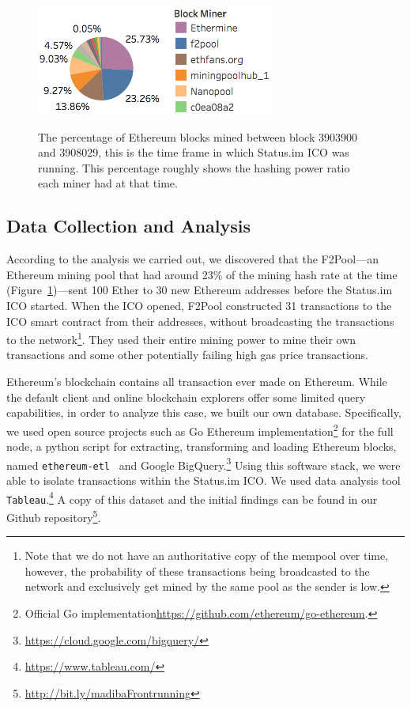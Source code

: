 \begin{figure}[h]
    \centering
{\caption[Ethereum blocks producers during the time of Status.im ICO]{The percentage of Ethereum blocks mined between block 3903900 and 3908029, this is the time frame in which Status.im ICO was running. This percentage roughly shows the hashing power ratio each miner had at that time.}\label{fig:mining_pool_ratio}}
{\includegraphics[width=0.7\textwidth]{figures/Mining_pool_ratio.png}}
\end{figure}

\subsection{Data Collection and Analysis}
According to the analysis we carried out, we discovered that the F2Pool---an Ethereum mining pool that had around 23\% of the mining hash rate at the time (Figure~\ref{fig:mining_pool_ratio})---sent 100 Ether to 30 new Ethereum addresses before the Status.im ICO started. When the ICO opened, F2Pool constructed 31 transactions to the ICO smart contract from their addresses, without broadcasting the transactions to the network\footnote{Note that we do not have an authoritative copy of the mempool over time, however, the probability of these transactions being broadcasted to the network and exclusively get mined by the same pool as the sender is low.}. They used their entire mining power to mine their own transactions and some other potentially failing high gas price transactions.

Ethereum's blockchain contains all transaction ever made on Ethereum. While the default client and online blockchain explorers offer some limited query capabilities, in order to analyze this case, we built our own database. Specifically, we used open source projects such as Go Ethereum implementation\footnote{Official Go implementation\url{https://github.com/ethereum/go-ethereum}.} for the full node, a python script for extracting, transforming and loading Ethereum blocks, named \texttt{ethereum-etl}~\cite{ethereumetl} and Google BigQuery.\footnote{\url{https://cloud.google.com/bigquery/}} Using this software stack, we were able to isolate transactions within the Status.im ICO. We used data analysis tool \texttt{Tableau}.\footnote{\url{https://www.tableau.com/}} A copy of this dataset and the initial findings can be found in our Github repository\footnote{\url{http://bit.ly/madibaFrontrunning}}.


